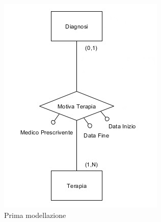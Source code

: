 \documentclass{article}
\begin{document}
\begin{figure}[!ht] %
  \centering 
  \begin{minipage}{.5\textwidth}
    \centering
    \includegraphics[width=\linewidth]{piccolo1}
    \caption{Prima modellazione}
    \label{schema_piccolo1}
  \end{minipage}%
  \begin{minipage}{.5\textwidth}
    \centering

\end{minipage}
\end{figure}
\end{document}
